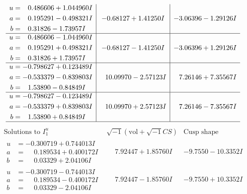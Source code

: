 \documentclass[1p]{elsarticle_modified}
\theoremstyle{definition}
\newcommand{\I}{\sqrt{-1}}
\begin{document}
$$\begin{array}{c|c|c}
\begin{aligned}
u &= \phantom{-}0.486606 + 1.044960 I \\
a &= \phantom{-}0.195291 - 0.498321 I \\
b &= \phantom{-}0.31826 - 1.73957 I\end{aligned}
 & -0.68127 + 1.41250 I & -3.06396 - 1.29126 I \\ \hline\begin{aligned}
u &= \phantom{-}0.486606 - 1.044960 I \\
a &= \phantom{-}0.195291 + 0.498321 I \\
b &= \phantom{-}0.31826 + 1.73957 I\end{aligned}
 & -0.68127 - 1.41250 I & -3.06396 + 1.29126 I \\ \hline\begin{aligned}
u &= -0.798627 + 0.123489 I \\
a &= -0.533379 - 0.839803 I \\
b &= \phantom{-}1.53890 - 0.84849 I\end{aligned}
 & \phantom{-}10.09970 - 2.57123 I & \phantom{-}7.26146 + 7.35567 I \\ \hline\begin{aligned}
u &= -0.798627 - 0.123489 I \\
a &= -0.533379 + 0.839803 I \\
b &= \phantom{-}1.53890 + 0.84849 I\end{aligned}
 & \phantom{-}10.09970 + 2.57123 I & \phantom{-}7.26146 - 7.35567 I\\
 \hline 
 \end{array}$$\newpage$$\begin{array}{c|c|c}  
\text{Solutions to }I^u_{1}& \I (\text{vol} + \sqrt{-1}CS) & \text{Cusp shape}\\
 \hline 
\begin{aligned}
u &= -0.300719 + 0.744013 I \\
a &= \phantom{-}0.189534 + 0.400172 I \\
b &= \phantom{-}0.03329 + 2.04106 I\end{aligned}
 & \phantom{-}7.92447 + 1.85760 I & -9.7550 - 10.3352 I \\ \hline\begin{aligned}
u &= -0.300719 - 0.744013 I \\
a &= \phantom{-}0.189534 - 0.400172 I \\
b &= \phantom{-}0.03329 - 2.04106 I\end{aligned}
 & \phantom{-}7.92447 - 1.85760 I & -9.7550 + 10.3352 I \\ \hline\begin{aligned}

\end{aligned}
\end{array}$$
\end{document}
